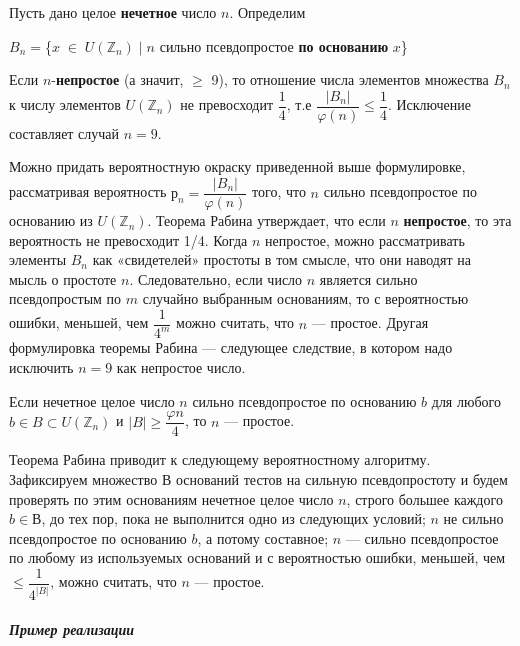   	\begin{thm}[Рабин]
  	\noindent
  	
  	Пусть дано целое {\bf нечетное} число $n$. Определим
  	\begin{center}
  		$B_n = $\{$x\;\in\;U(\mathbb Z_n)\;|\;n$ сильно псевдопростое {\bf по основанию} $x$\} 
  	\end{center}
  	Если $n$-{\bf непростое} (а значит, $\geqslant$ 9), то отношение числа элементов множества $B_n$
  	к числу элементов $U(\mathbb Z_n)$ не превосходит $\dfrac{1}{4}$, т.е $\dfrac{|B_n|}{\varphi(n)} \leqslant \dfrac{1}{4}$. Исключение составляет случай $n = 9$.
  	\end{thm}
  	Можно придать вероятностную окраску приведенной выше формулировке, рассматривая вероятность $р_n = \dfrac{|B_n|}{\varphi(n)}$ того, что $n$ сильно псевдопростое по основанию из $U(\mathbb Z_n)$. Теорема Рабина утверждает, что 	если $n$ {\bf непростое}, то эта вероятность не превосходит 1/4. Когда $n$  	непростое, можно рассматривать элементы $B_n$	как «свидетелей» простоты в том смысле, что они наводят на мысль о простоте $n$. Следовательно, если число $n$ является сильно псевдопростым по $m$ случайно 	выбранным основаниям, то с вероятностью ошибки, меньшей, чем $\dfrac{1}{4^m}$ можно считать, что $n$ — простое. Другая формулировка теоремы Рабина — следующее следствие, в котором надо исключить $n = 9$ как непростое число.

  	
  	\begin{sled}
  	\noindent
  	
  	Если нечетное целое число $n$ сильно псевдопростое по основанию $b$	для любого $b \in B\subset U(\mathbb Z_n)$ и $|B| \geqslant \dfrac{\varphi{n}}{4}$, то $n$  — простое.
  	\end{sled}
  	Теорема Рабина приводит к следующему вероятностному алгорит­му. Зафиксируем множество $В$ оснований тестов на сильную псевдопростоту и будем проверять по этим основаниям нечетное целое число $n$, строго большее каждого $b \in В$, до тех пор, пока не выполнится одно из следующих условий; $n$ не сильно псевдопростое по основанию $b$, а  	потому составное; $n$ — сильно псевдопростое по любому из используе­мых оснований и с вероятностью ошибки, меньшей, чем $\leqslant\dfrac{1}{4^{|B|}}$, можно считать, что $n$ — простое.

  	
  	\paragraph{{\it Пример реализации}}
  	\noindent
  	
